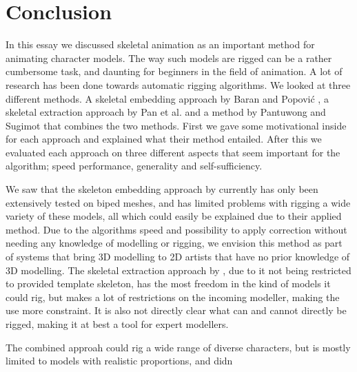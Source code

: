 \documentclass{article}
\begin{document}
\section{Conclusion}
In this essay we discussed skeletal animation as an important method for
animating character models. The way such models are rigged can be a rather
cumbersome task, and daunting for beginners in the field of animation. A lot of
research has been done towards automatic rigging algorithms. We looked at three
different methods. A skeletal embedding approach by Baran and Popovi\'{c} \citep{paper1}, a skeletal
extraction approach by Pan et al. \citep{paper2} and a method by Pantuwong and
Sugimot \citep{paper2} that
combines the two methods. First we gave some motivational inside for each
approach and explained what their method entailed. After this we evaluated each
approach on three different aspects that seem important for the algorithm; speed
performance, generality and self-sufficiency. 

We saw that the skeleton embedding approach by \citep{paper1} currently has only
been extensively tested on biped meshes, and has limited problems with rigging a
wide variety of these models, all which could easily be explained due to their
applied method. Due to the algorithms speed and possibility to apply correction
without needing any knowledge of modelling or rigging, we envision this method
as part of systems that bring 3D modelling to 2D artists that have no prior
knowledge of 3D modelling.
The skeletal extraction approach by \citep{paper2}, due to it not being restricted to provided
template skeleton, has the most freedom in the kind of models it could rig, but
makes a lot of restrictions on the incoming modeller, making the use more
constraint. It is also not directly clear what can and cannot directly be
rigged, making it at best a tool for expert modellers. 

The combined approah could rig a wide range of diverse characters, but is mostly
limited to models with realistic proportions, and didn




\end{document}
